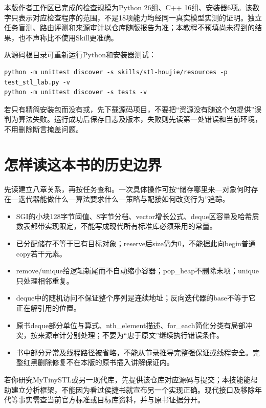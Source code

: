 \documentclass[11pt,a4paper,fontset=fandol]{ctexart}
\begin{document}
本版作者工作区已完成的检查规模为Python 26组、C++ 16组、安装器6项。该数字只表示对应检查程序的范围，不是18项能力均经同一真实模型实测的证明。独立任务盲测、路由评测和来源审计以仓库随版报告为准；本教程不预填尚未得到的结果，也不声称比不使用Skill更准确。

从源码根目录可重新运行Python和安装器测试：
\begin{lstlisting}
python -m unittest discover -s skills/stl-houjie/resources -p test_stl_lab.py -v
python -m unittest discover -s tests -v
\end{lstlisting}
若只有精简安装包而没有或，先下载源码项目，不要把“资源没有随这个包提供”误判为算法失败。运行成功后保存日志及版本，失败则先读第一处错误和当前环境，不用删除断言掩盖问题。
\section{怎样读这本书的历史边界}
先读建立八章关系，再按任务查和。一次具体操作可按“储存哪里来—对象何时存在—迭代器能做什么—算法要求什么—策略与配接如何改变行为”追踪。

\begin{itemize}
\item SGI的小块128字节阈值、8字节分档、vector增长公式、deque区容量及哈希质数表都带实现限定，不能写成现代所有标准库必须采用的常量。
\item 已分配储存不等于已有目标对象；reserve后size仍为0，不能据此向begin普通copy若干元素。
\item remove/unique给逻辑新尾而不自动缩小容器；pop\_heap不删除末项；unique只处理相邻重复。
\item deque中的随机访问不保证整个序列是连续地址；反向迭代器的base不等于它正在解引用的位置。
\item 原书deque部分单位与算式、nth\_element描述、for\_each简化分类有局部冲突，按来源审计分别处理；不要为“忠于原文”继续执行错误条件。
\item 书中部分异常及线程路径被省略，不能从节录推导完整强保证或线程安全。完整红黑删除修复不在本版的原书插入讲解保证内。
\end{itemize}
若你研究MyTinySTL或另一现代库，先提供该仓库对应源码与提交；本技能能帮助建立分析框架，不能因为看过侯捷书就宣布另一个实现正确。现代接口及移除年代等事实需查当前官方标准或目标库资料，并与原书证据分开。
\end{document}

